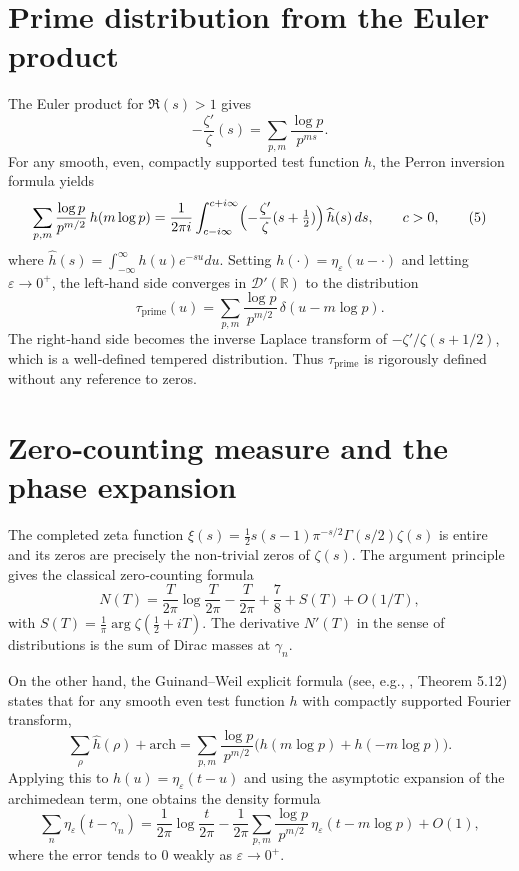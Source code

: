 \documentclass[12pt,a4paper]{article}
\newcommand{\R}{\mathbb{R}}
\newcommand{\dist}{\mathcal{D}'}
\begin{document}
\section{Prime distribution from the Euler product}
The Euler product for $\Re(s)>1$ gives
\[
-\frac{\zeta'}{\zeta}(s) = \sum_{p,m} \frac{\log p}{p^{ms}}.
\tag{4}
\]
For any smooth, even, compactly supported test function $h$, the Perron inversion formula yields
\[
\sum_{p,m}\frac{\log p}{p^{m/2}}\,h(m\log p)=\frac{1}{2\pi i}\int_{c-i\infty}^{c+i\infty}
\Bigl( -\frac{\zeta'}{\zeta}(s+\tfrac12) \Bigr)\,\widehat{h}(s)\,ds,\qquad c>0,
\tag{5}
\]
where $\widehat{h}(s)=\int_{-\infty}^\infty h(u)e^{-su}du$.  Setting $h(\cdot) = \eta_\varepsilon(u-\cdot)$ and letting $\varepsilon\to0^+$, the left‑hand side converges in $\dist(\R)$ to the distribution
\[
\tau_{\text{prime}}(u) = \sum_{p,m}\frac{\log p}{p^{m/2}}\,\delta(u-m\log p).
\tag{6}
\]
The right‑hand side becomes the inverse Laplace transform of $-\zeta'/\zeta(s+1/2)$, which is a well‑defined tempered distribution.  Thus $\tau_{\text{prime}}$ is rigorously defined without any reference to zeros.

\section{Zero‑counting measure and the phase expansion}
The completed zeta function $\xi(s)=\frac12 s(s-1)\pi^{-s/2}\Gamma(s/2)\zeta(s)$ is entire and its zeros are precisely the non‑trivial zeros of $\zeta(s)$.  The argument principle gives the classical zero‑counting formula
\[
N(T) = \frac{T}{2\pi}\log\frac{T}{2\pi} - \frac{T}{2\pi} + \frac{7}{8} + S(T) + O(1/T),
\tag{7}
\]
with $S(T)=\frac{1}{\pi}\arg\zeta(\frac12+iT)$.  The derivative $N'(T)$ in the sense of distributions is the sum of Dirac masses at $\gamma_n$.

On the other hand, the Guinand–Weil explicit formula (see, e.g., \cite{IwaniecKowalski}, Theorem 5.12) states that for any smooth even test function $h$ with compactly supported Fourier transform,
\[
\sum_{\rho} \widehat{h}(\rho) + \text{arch} = \sum_{p,m}\frac{\log p}{p^{m/2}}\bigl( h(m\log p) + h(-m\log p) \bigr).
\tag{8}
\]
Applying this to $h(u)=\eta_\varepsilon(t-u)$ and using the asymptotic expansion of the archimedean term, one obtains the density formula
\[
\sum_n \eta_\varepsilon(t-\gamma_n) = \frac{1}{2\pi}\log\frac{t}{2\pi} - \frac{1}{2\pi}\sum_{p,m}\frac{\log p}{p^{m/2}}\,\eta_\varepsilon(t-m\log p) + O(1),
\tag{9}
\]
where the error tends to $0$ weakly as $\varepsilon\to0^+$.
\end{document}
